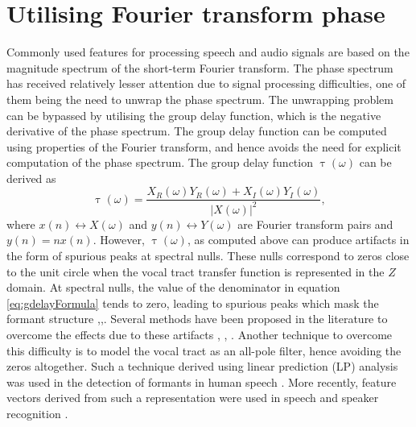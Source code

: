 \documentclass[a4paper]{article}
\begin{document}
\section{Utilising Fourier transform phase}
\label{sec:gdReview}

Commonly used features for processing speech and audio signals are based on the
magnitude spectrum of the short-term Fourier transform. The phase spectrum has
received relatively lesser attention due to signal processing difficulties, one
of them being the need to unwrap the phase spectrum. The unwrapping problem can
be bypassed by utilising the group delay function, which is the negative
derivative of the phase spectrum. The group delay function can be computed using
properties of the Fourier transform, and hence avoids the need for explicit
computation of the phase spectrum. The group delay function
$\uptau(\omega)$ can be derived as \cite{gdDeriv}
\begin{equation}
\uptau(\omega) = \frac{X_R(\omega) Y_R(\omega) + X_I(\omega)
Y_I(\omega)}{|X(\omega)|^2},
\label{eq:gdelayFormula}
\end{equation}
where $x(n) \leftrightarrow X(\omega)$ and $y(n) \leftrightarrow Y(\omega)$ are
Fourier transform pairs and $y(n) = n x(n)$.  However, $\uptau(\omega)$, as
computed above can produce artifacts in the form of spurious peaks at spectral
nulls. These nulls correspond to zeros close to the unit circle when the vocal
tract transfer function is represented in the $Z$ domain.  At spectral nulls,
the value of the denominator in equation \ref{eq:gdelayFormula} tends to zero,
leading to spurious peaks which mask the formant structure
\cite{hema},\cite{hemaSigProc1989},\cite{chirpGD}.  Several methods have been
proposed in the literature to overcome the effects due to these artifacts
\cite{modgdf}, \cite{productSpectrum}, \cite{chirpGD}. Another technique to
overcome this difficulty is to model the vocal tract as an all-pole filter,
hence avoiding the zeros altogether. Such a technique derived using linear
prediction (LP) analysis was used in the detection of formants in human speech
\cite{yegnaFormant}. More recently, feature vectors derived from such a representation 
were used in speech \cite{drugman} and speaker recognition \cite{padman}. 
\end{document}

